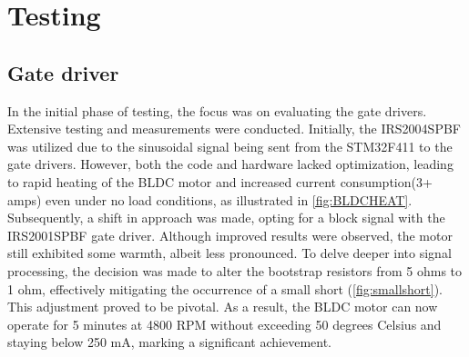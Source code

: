 \section{Testing}
\subsection{Gate driver}\label{Gate driver}
In the initial phase of testing, the focus was on evaluating the gate drivers. Extensive testing and measurements were conducted. Initially, the IRS2004SPBF\cite{infineon-irs2004-datasheet} was utilized due to the sinusoidal signal being sent from the STM32F411\cite{stm32-base-board} to the gate drivers. However, both the code and hardware lacked optimization, leading to rapid heating of the BLDC motor\cite{reichelt-motor-datasheet} and increased current consumption(3+ amps) even under no load conditions, as illustrated in \autoref{fig:BLDCHEAT}. Subsequently, a shift in approach was made, opting for a block signal with the IRS2001SPBF\cite{infineon-irs2001-datasheet} gate driver. Although improved results were observed, the motor still exhibited some warmth, albeit less pronounced. To delve deeper into signal processing, the decision was made to alter the bootstrap resistors from 5 ohms to 1 ohm, effectively mitigating the occurrence of a small short (\autoref{fig:smallshort}). This adjustment proved to be pivotal. As a result, the BLDC motor\cite{reichelt-motor-datasheet} can now operate for 5 minutes at 4800 RPM without exceeding 50 degrees Celsius and staying below 250 mA, marking a significant achievement.
